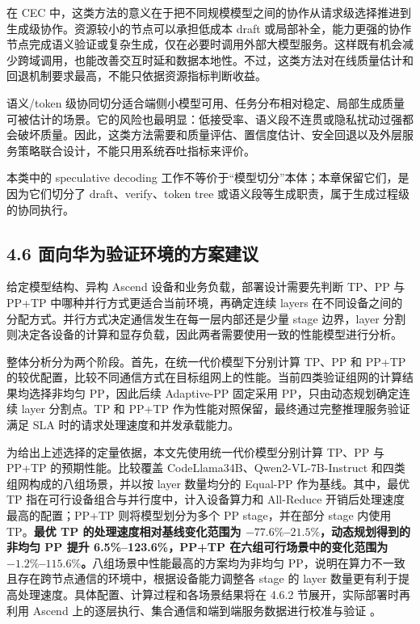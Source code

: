 在 CEC 中，这类方法的意义在于把不同规模模型之间的协作从请求级选择推进到生成级协作。资源较小的节点可以承担低成本 draft 或局部补全，能力更强的协作节点完成语义验证或复杂生成，仅在必要时调用外部大模型服务。这样既有机会减少跨域调用，也能改善交互时延和数据本地性。不过，这类方法对在线质量估计和回退机制要求最高，不能只依据资源指标判断收益。

语义/token 级协同切分适合端侧小模型可用、任务分布相对稳定、局部生成质量可被估计的场景。它的风险也最明显：低接受率、语义段不连贯或隐私扰动过强都会破坏质量。因此，这类方法需要和质量评估、置信度估计、安全回退以及外层服务策略联合设计，不能只用系统吞吐指标来评价。

本类中的 speculative decoding 工作不等价于“模型切分”本体；本章保留它们，是因为它们切分了 draft、verify、token tree 或语义段等生成职责，属于生成过程级的协同执行。
\subsection*{4.6 面向华为验证环境的方案建议}

给定模型结构、异构 Ascend 设备和业务负载，部署设计需要先判断 TP、PP 与 PP+TP 中哪种并行方式更适合当前环境，再确定连续 layers 在不同设备之间的分配方式。并行方式决定通信发生在每一层内部还是少量 stage 边界，layer 分割则决定各设备的计算和显存负载，因此两者需要使用一致的性能模型进行分析。

整体分析分为两个阶段。首先，在统一代价模型下分别计算 TP、PP 和 PP+TP 的较优配置，比较不同通信方式在目标组网上的性能。当前四类验证组网的计算结果均选择非均匀 PP，因此后续 Adaptive-PP 固定采用 PP，只由动态规划确定连续 layer 分割点。TP 和 PP+TP 作为性能对照保留，最终通过完整推理服务验证满足 SLA 时的请求处理速度和并发承载能力。

为给出上述选择的定量依据，本文先使用统一代价模型分别计算 TP、PP 与 PP+TP 的预期性能。比较覆盖 CodeLlama34B、Qwen2-VL-7B-Instruct 和四类组网构成的八组场景，并以按 layer 数量均分的 Equal-PP 作为基线。其中，最优 TP 指在可行设备组合与并行度中，计入设备算力和 All-Reduce 开销后处理速度最高的配置；PP+TP 则将模型划分为多个 PP stage，并在部分 stage 内使用 TP。\textbf{最优 TP 的处理速度相对基线变化范围为 \(-77.6\%\)--\(21.5\%\)，动态规划得到的非均匀 PP 提升 6.5\%--123.6\%，PP+TP 在六组可行场景中的变化范围为 \(-1.2\%\)--\(115.6\%\)。}八组场景中性能最高的方案均为非均匀 PP，说明在算力不一致且存在跨节点通信的环境中，根据设备能力调整各 stage 的 layer 数量更有利于提高处理速度。具体配置、计算过程和各场景结果将在 4.6.2 节展开，实际部署时再利用 Ascend 上的逐层执行、集合通信和端到端服务数据进行校准与验证 \cite{huawei2026internal}。

